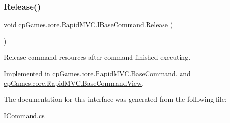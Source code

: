 \subsubsection{\texorpdfstring{Release()}{Release()}}
{\footnotesize\ttfamily void cp\+Games.\+core.\+Rapid\+M\+V\+C.\+I\+Base\+Command.\+Release (\begin{DoxyParamCaption}{ }\end{DoxyParamCaption})}



Release command resources after command finished executing. 



Implemented in \mbox{\hyperlink{classcp_games_1_1core_1_1_rapid_m_v_c_1_1_base_command_afa3a355d140a2a088cfa7e5f4d71a07b}{cp\+Games.\+core.\+Rapid\+M\+V\+C.\+Base\+Command}}, and \mbox{\hyperlink{classcp_games_1_1core_1_1_rapid_m_v_c_1_1_base_command_view_af5c36b96f3c29382b3809bd0c25130c3}{cp\+Games.\+core.\+Rapid\+M\+V\+C.\+Base\+Command\+View}}.



The documentation for this interface was generated from the following file\+:\begin{DoxyCompactItemize}
\item 
\mbox{\hyperlink{_i_command_8cs}{I\+Command.\+cs}}\end{DoxyCompactItemize}
